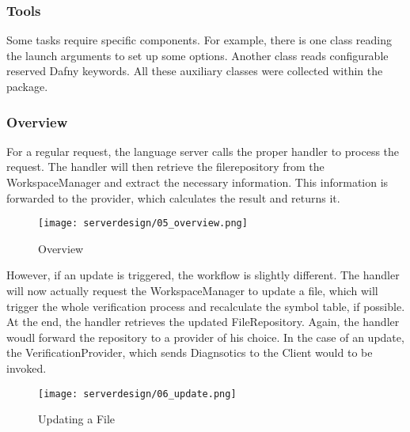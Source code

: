 \subsubsection{Tools}
Some tasks require specific components. For example, there is one class reading the launch arguments to set up some options. Another class reads configurable reserved Dafny keywords. All these auxiliary classes were collected within the  package.

\subsubsection{Overview}
For a regular request, the language server calls the proper handler to process the request. The handler will then retrieve the filerepository from the WorkspaceManager and extract the necessary information. This information is forwarded to the provider, which calculates the result and returns it.

\begin{figure}[H]
    \centering
    \texttt{[image: serverdesign/05\_overview.png]}
    \caption{Overview}
    \label{fig:server_overview}
\end{figure}


However, if an update is triggered, the workflow is slightly different. The handler will now actually request the WorkspaceManager to update a file, which will trigger the whole verification process and recalculate the symbol table, if possible. At the end, the handler retrieves the updated FileRepository. Again, the handler woudl forward the repository to a provider of his choice. In the case of an update, the VerificationProvider, which sends Diagnsotics to the Client would to be invoked.

\begin{figure}[H]
    \centering
    \texttt{[image: serverdesign/06\_update.png]}
    \caption{Updating a File}
    \label{fig:server_update}
\end{figure}



